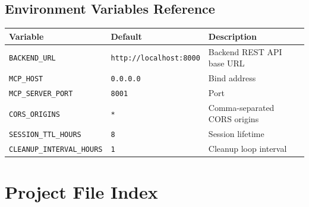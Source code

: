 \documentclass[12pt,a4paper]{report}
\begin{document}
\section{Environment Variables Reference}

\begin{center}
\begin{tabularx}{\linewidth}{llX}
  \toprule
  \textbf{Variable} & \textbf{Default} & \textbf{Description} \\
  \midrule
  \texttt{BACKEND\_URL}            & \texttt{http://localhost:8000} & Backend REST API base URL \\
  \texttt{MCP\_HOST}               & \texttt{0.0.0.0}              & Bind address \\
  \texttt{MCP\_SERVER\_PORT}       & \texttt{8001}                 & Port \\
  \texttt{CORS\_ORIGINS}           & \texttt{*}                    & Comma-separated CORS origins \\
  \texttt{SESSION\_TTL\_HOURS}     & \texttt{8}                    & Session lifetime \\
  \texttt{CLEANUP\_INTERVAL\_HOURS} & \texttt{1}                   & Cleanup loop interval \\
  \bottomrule
\end{tabularx}
\end{center}

\chapter{Project File Index}
\end{document}
